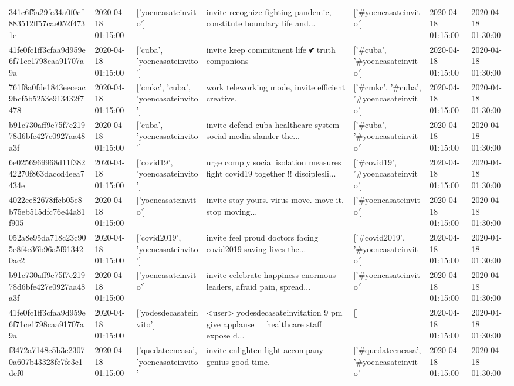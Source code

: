 \begin{tabular}{lllllll}
341c6f5a29fc34a0f0cf883512ff57cae052f4731e & 2020-04-18 01:15:00 & ['yoencasateinvito'] & invite recognize fighting pandemic, constitute boundary life and... & ['#yoencasateinvito'] & 2020-04-18 01:15:00 & 2020-04-18 01:30:00 \\
41fe0fc1ff3cfaa9d959e6f71ce1798caa91707a9a & 2020-04-18 01:15:00 & ['cuba', 'yoencasateinvito'] & invite keep commitment life 💕 truth companions & ['#cuba', '#yoencasateinvito'] & 2020-04-18 01:15:00 & 2020-04-18 01:30:00 \\
761f8a0fde1843eeceac9bcf5b5253e913432f7478 & 2020-04-18 01:15:00 & ['cmkc', 'cuba', 'yoencasateinvito'] & work teleworking mode, invite efficient creative. & ['#cmkc', '#cuba', '#yoencasateinvito'] & 2020-04-18 01:15:00 & 2020-04-18 01:30:00 \\
b91c730aff9e75f7c21978d6bfe427e0927aa48a3f & 2020-04-18 01:15:00 & ['cuba', 'yoencasateinvito'] & invite defend cuba healthcare system social media slander the... & ['#cuba', '#yoencasateinvito'] & 2020-04-18 01:15:00 & 2020-04-18 01:30:00 \\
6e0256969968d11f38242270f863daccd4eea7434e & 2020-04-18 01:15:00 & ['covid19', 'yoencasateinvito'] & urge comply social isolation measures fight covid19 together !!️ disciplesli... & ['#covid19', '#yoencasateinvito'] & 2020-04-18 01:15:00 & 2020-04-18 01:30:00 \\
4022ee82678ffcb05e8b75eb515dfc76e44a81f905 & 2020-04-18 01:15:00 & ['yoencasateinvito'] & invite stay yours. virus move. move it. stop moving... & ['#yoencasateinvito'] & 2020-04-18 01:15:00 & 2020-04-18 01:30:00 \\
052a8e95da718c23c905e8f4e36b96a5f913420ac2 & 2020-04-18 01:15:00 & ['covid2019', 'yoencasateinvito'] & invite feel proud doctors facing covid2019 saving lives the... & ['#covid2019', '#yoencasateinvito'] & 2020-04-18 01:15:00 & 2020-04-18 01:30:00 \\
b91c730aff9e75f7c21978d6bfe427e0927aa48a3f & 2020-04-18 01:15:00 & ['yoencasateinvito'] & invite celebrate happiness enormous leaders, afraid pain, spread... & ['#yoencasateinvito'] & 2020-04-18 01:15:00 & 2020-04-18 01:30:00 \\
41fe0fc1ff3cfaa9d959e6f71ce1798caa91707a9a & 2020-04-18 01:15:00 & ['yodesdecasateinvito'] & <user> yodesdecasateinvitation 9️ pm give applause 👏👏👏 healthcare staff 🏻 ️ expose d... & [] & 2020-04-18 01:15:00 & 2020-04-18 01:30:00 \\
f3472a7148c5b3e23070a607b43328fe7fe3e1dcf0 & 2020-04-18 01:15:00 & ['quedateencasa', 'yoencasateinvito'] & invite enlighten light accompany genius good time. & ['#quedateencasa', '#yoencasateinvito'] & 2020-04-18 01:15:00 & 2020-04-18 01:30:00 \\

\end{tabular}
